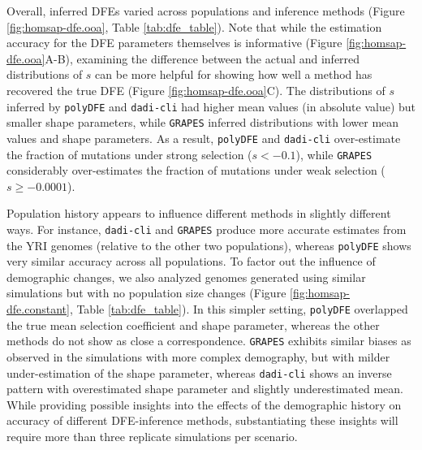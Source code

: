 \documentclass[hidelinks]{article}
\newcommand{\polydfe}{\texttt{polyDFE}\xspace}
\newcommand{\dadicli}{\texttt{dadi-cli}\xspace}
\newcommand{\grapes}{\texttt{GRAPES}\xspace}
\begin{document}
    Overall, inferred DFEs varied across populations and inference methods (Figure \ref{fig:homsap-dfe.ooa}, Table \ref{tab:dfe_table}).
    Note that while the estimation accuracy for the DFE parameters themselves is informative (Figure \ref{fig:homsap-dfe.ooa}A-B),
    examining the difference between the actual and inferred distributions of $s$ can be more helpful for showing how well a method
    has recovered the true DFE (Figure \ref{fig:homsap-dfe.ooa}C).
    The distributions of $s$ inferred by \polydfe and \dadicli had higher mean values (in absolute value)
    but smaller shape parameters, while \grapes inferred distributions with lower mean values and shape parameters.
    As a result, \polydfe and \dadicli over-estimate the fraction of mutations under strong selection ($s<-0.1$),
    while \grapes considerably over-estimates the fraction of mutations under weak selection ($s\geq-0.0001$).

    Population history appears to influence different methods in slightly different ways.
    For instance, \dadicli and \grapes produce more accurate estimates from the YRI genomes
    (relative to the other two populations), whereas \polydfe
    shows very similar accuracy across all populations.
    To factor out the influence of demographic changes, we also analyzed genomes generated using similar
    simulations but with no population size changes (Figure \ref{fig:homsap-dfe.constant}, Table \ref{tab:dfe_table}).
    In this simpler setting, \polydfe overlapped the true mean selection coefficient and shape parameter, whereas
    the other methods do not show as close a correspondence.
    \grapes exhibits similar biases as observed in the simulations with more complex demography,
    but with milder under-estimation of the shape parameter,
    whereas \dadicli shows an inverse pattern
    with overestimated shape parameter and slightly underestimated mean.
    While providing possible insights into the effects of the demographic history
    on accuracy of different DFE-inference methods, substantiating these insights
    will require more than three replicate simulations per scenario.
\end{document}
